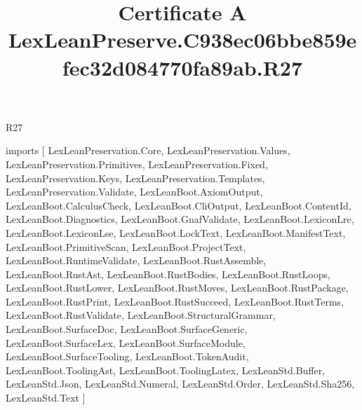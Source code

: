 \begin{lexlean}{R27}
\title{Certificate A LexLeanPreserve.C938ec06bbe859efec32d084770fa89ab.R27}
\begin{coremodule}
imports [
  LexLeanPreservation.Core,
  LexLeanPreservation.Values,
  LexLeanPreservation.Primitives,
  LexLeanPreservation.Fixed,
  LexLeanPreservation.Keys,
  LexLeanPreservation.Templates,
  LexLeanPreservation.Validate,
  LexLeanBoot.AxiomOutput,
  LexLeanBoot.CalculusCheck,
  LexLeanBoot.CliOutput,
  LexLeanBoot.ContentId,
  LexLeanBoot.Diagnostics,
  LexLeanBoot.GnafValidate,
  LexLeanBoot.LexiconLre,
  LexLeanBoot.LexiconLse,
  LexLeanBoot.LockText,
  LexLeanBoot.ManifestText,
  LexLeanBoot.PrimitiveScan,
  LexLeanBoot.ProjectText,
  LexLeanBoot.RuntimeValidate,
  LexLeanBoot.RustAssemble,
  LexLeanBoot.RustAst,
  LexLeanBoot.RustBodies,
  LexLeanBoot.RustLoops,
  LexLeanBoot.RustLower,
  LexLeanBoot.RustMoves,
  LexLeanBoot.RustPackage,
  LexLeanBoot.RustPrint,
  LexLeanBoot.RustSucceed,
  LexLeanBoot.RustTerms,
  LexLeanBoot.RustValidate,
  LexLeanBoot.StructuralGrammar,
  LexLeanBoot.SurfaceDoc,
  LexLeanBoot.SurfaceGeneric,
  LexLeanBoot.SurfaceLex,
  LexLeanBoot.SurfaceModule,
  LexLeanBoot.SurfaceTooling,
  LexLeanBoot.TokenAudit,
  LexLeanBoot.ToolingAst,
  LexLeanBoot.ToolingLatex,
  LexLeanStd.Buffer,
  LexLeanStd.Json,
  LexLeanStd.Numeral,
  LexLeanStd.Order,
  LexLeanStd.Sha256,
  LexLeanStd.Text
]


\end{coremodule}
\end{lexlean}
